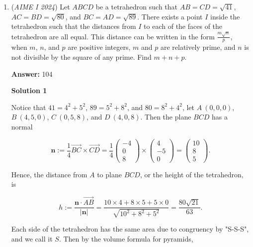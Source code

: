 \begin{enumerate}
 Continue as in solution 1 to obtain $\boxed{110}$.

 


 


	\item (\textit{AIME I 2024}) Let $ABCD$ be a tetrahedron such that $AB = CD = \sqrt{41}$, $AC = BD = \sqrt{80}$, and $BC = AD = \sqrt{89}$. There exists a point $I$ inside the tetrahedron such that the distances from $I$ to each of the faces of the tetrahedron are all equal. This distance can be written in the form $\frac{m \sqrt{n}}{p}$, when $m$, $n$, and $p$ are positive integers, $m$ and $p$ are relatively prime, and $n$ is not divisible by the square of any prime. Find $m+n+p$.


 
 \textbf{Answer: }104



\textbf{Solution 1}

Notice that \(41=4^2+5^2\), \(89=5^2+8^2\), and \(80=8^2+4^2\), let \(A~(0,0,0)\), \(B~(4,5,0)\), \(C~(0,5,8)\), and \(D~(4,0,8)\). Then the plane \(BCD\) has a normal

 \begin{equation*}\mathbf n:=\frac14\overrightarrow{BC}\times\overrightarrow{CD}=\frac14\begin{pmatrix}-4\\0\\8\end{pmatrix}\times\begin{pmatrix}4\\-5\\0\end{pmatrix}=\begin{pmatrix}10\\8\\5\end{pmatrix}.\end{equation*}

 Hence, the distance from \(A\) to plane \(BCD\), or the height of the tetrahedron, is

 \begin{equation*}h:=\frac{\mathbf n\cdot\overrightarrow{AB}}{|\mathbf n|}=\frac{10\times4+8\times5+5\times0}{\sqrt{10^2+8^2+5^2}}=\frac{80\sqrt{21}}{63}.\end{equation*}

 Each side of the tetrahedron has the same area due to congruency by "S-S-S", and we call it \(S\). Then by the volume formula for pyramids,


\end{enumerate}
